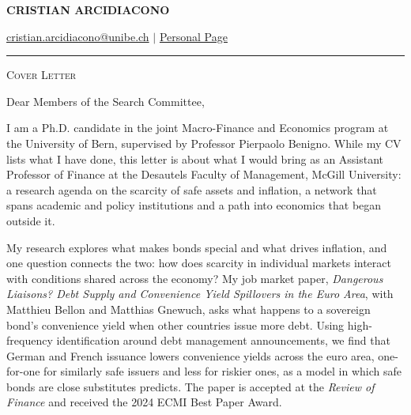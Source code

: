 \documentclass[11pt]{article}
\begin{document}
 
\begin{center}
    \textbf{\large \scshape CRISTIAN ARCIDIACONO}
\end{center}

\begin{center}
    {\href{mailto:cristian.arcidiacono@unibe.ch}{cristian.arcidiacono@unibe.ch} $\vert$ \href{https://sites.google.com/view/cristian-arcidiacono/home}{Personal Page}}
\end{center}
\vspace{-0.2cm}
\noindent\rule{\textwidth}{0.4pt}

\vspace{0.2cm}

\begin{center}
    {\large \scshape Cover Letter}
\end{center}

\vspace{0.3cm}

Dear Members of the Search Committee,

I am a Ph.D. candidate in the joint Macro-Finance and Economics program at the University of Bern, supervised by Professor Pierpaolo Benigno. While my CV lists what I have done, this letter is about what I would bring as an Assistant Professor of Finance at the Desautels Faculty of Management, McGill University: a research agenda on the scarcity of safe assets and inflation, a network that spans academic and policy institutions and a path into economics that began outside it.

My research explores what makes bonds special and what drives inflation, and one question connects the two: how does scarcity in individual markets interact with conditions shared across the economy? My job market paper, \textit{Dangerous Liaisons? Debt Supply and Convenience Yield Spillovers in the Euro Area}, with Matthieu Bellon and Matthias Gnewuch, asks what happens to a sovereign bond's convenience yield when other countries issue more debt. Using high-frequency identification around debt management announcements, we find that German and French issuance lowers convenience yields across the euro area, one-for-one for similarly safe issuers and less for riskier ones, as a model in which safe bonds are close substitutes predicts. The paper is accepted at the \textit{Review of Finance} and received the 2024 ECMI Best Paper Award.
\end{document}
